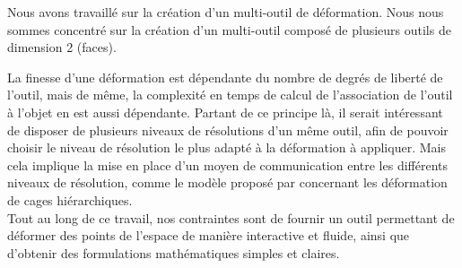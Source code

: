 Nous avons travaillé sur la création d'un multi-outil de déformation. Nous nous
sommes concentré sur la création d'un multi-outil composé de plusieurs outils de
dimension 2 (faces).

La finesse d'une déformation est dépendante du nombre de degrés de liberté de
l'outil, mais de même, la complexité en temps de calcul de l'association de
l'outil à l'objet en est aussi dépendante. Partant de ce principe là, il
serait intéressant de disposer de plusieurs niveaux de résolutions d'un même
outil, afin de pouvoir choisir le niveau de résolution le plus adapté à la
déformation à appliquer. Mais cela implique la mise en place d'un moyen de
communication entre les différents niveaux de résolution, comme le modèle
proposé par \cite{Hur12} concernant les déformation de cages hiérarchiques. \\

Tout au long de ce travail, nos contraintes sont de fournir un outil
permettant de déformer des points de l'espace de manière interactive
et fluide, ainsi que d'obtenir des formulations mathématiques simples
et claires.


